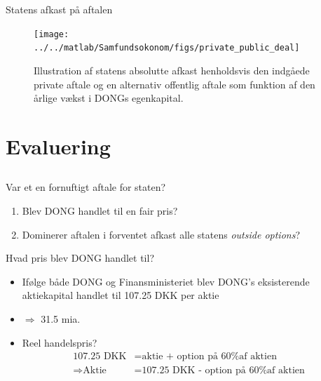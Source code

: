 \documentclass{beamer}
\begin{document}
\begin{frame}{Statens afkast på aftalen}

\begin{figure}
\texttt{[image: ../../matlab/Samfundsokonom/figs/private\_public\_deal]}
\caption{Illustration af statens absolutte afkast henholdsvis  den indgåede private aftale og en alternativ offentlig aftale som funktion af den årlige vækst i DONGs egenkapital. }
\label{fig:privat_off}
\end{figure}


\end{frame}

\section{Evaluering}
\subsection{}

\begin{frame}{Var et en fornuftigt aftale for staten?}
	\begin{enumerate}
		\item Blev DONG handlet til en fair pris?
		\pause
		\item Dominerer aftalen i forventet afkast alle statens \emph{outside options}? 
	\end{enumerate}
\end{frame}

\begin{frame}{Hvad pris blev DONG handlet til?}

\begin{itemize}
	\item Ifølge både DONG og Finansministeriet blev DONG's eksisterende aktiekapital handlet til 107.25 DKK per aktie 
	\item $\Rightarrow$ 31.5 mia. 
	\pause
	\item Reel handelspris?
\begin{align}
\text{107.25 DKK} &= \text{aktie + option på 60\% af aktien} \nonumber \\
\Rightarrow \text{Aktie} &= \text{107.25 DKK - option på 60\% af aktien  }
\end{align}
\end{itemize}

\end{frame}
\end{document}
